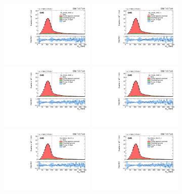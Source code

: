 \begin{figure}
    \centering
    \includegraphics[width=0.4\textwidth]{figure/FitResult_18_el_lep_tmass_obs3_p_chi2_20.pdf}
    \includegraphics[width=0.4\textwidth]{figure/FitResult_18_el_lep_tmass_obs3_n_chi2_20.pdf}
    \includegraphics[width=0.4\textwidth]{figure/FitResult_18_el_lep_tmass_obs6_p_chi2_20.pdf}
    \includegraphics[width=0.4\textwidth]{figure/FitResult_18_el_lep_tmass_obs6_n_chi2_20.pdf}
    \includegraphics[width=0.4\textwidth]{figure/FitResult_18_el_lep_tmass_obs12_p_chi2_20.pdf}
    \includegraphics[width=0.4\textwidth]{figure/FitResult_18_el_lep_tmass_obs12_n_chi2_20.pdf}

\end{figure}
